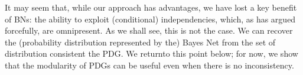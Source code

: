 \documentclass{article}
\newcommand{\MN}{PDG}
\newcommand{\MNs}{\MN s}
\numberwithin{equation}{section}
\begin{document}
\begin{notfocus}
	It may seem that, while our approach has advantages, we have lost a
	key benefit of BNs: the ability to exploit (conditional)
	independencies, which, as \textcite{pearl2014probabilistic} has argued
	forcefully, are omnipresent.  As we shall see, this is not the case.  
We can recover the (probability distribution represented by the)
Bayes Net from the set of distribution consistent the PDG.
We returnto this point below; for now, we show that 
the modularity of PDGs can be useful even when there is no
inconsistency.

\end{notfocus}
\end{document}
